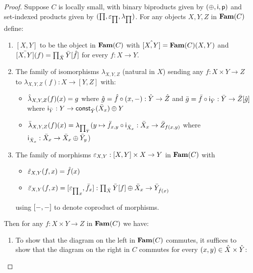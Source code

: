 \begin{proof}
Suppose $C$ is locally small, with binary biproducts given by $(\oplus,\mathsf{i},\mathsf{p})$ and set-indexed products
given by $(\prod,\varepsilon_{\prod},\lambda_{\prod})$. For any objects $X, Y, Z$ in $\mathbf{Fam}(C)$ define:

\begin{enumerate}
\item $[X, Y]$ to be the object in $\mathbf{Fam}(C)$ with $\hat{[X,Y]} = \mathbf{Fam}(C)(X,Y)$ and $\bar{[X, Y]}(f) =
\prod_{\hat{X}}\bar{Y}[\hat{f}]$ for every $f: X \to Y$.
\item The family of isomorphisms $\lambda_{X,Y,Z}$ (natural in $X$) sending any $f: X \times Y \to Z$ to
$\lambda_{X,Y,Z}(f): X \to [Y, Z]$ with:
\begin{itemize}
\item $\hat{\lambda}_{X,Y,Z}(f)(x) = g$ where $\hat{g} = \hat{f} \circ (x, -): \hat{Y} \to \hat{Z}$ and
$\bar{g} = \bar{f} \circ \mathsf{i}_{\bar{Y}}: \bar{Y} \to \bar{Z}[\hat{g}]$ where $\mathsf{i}_{\bar{Y}}:
Y \to \mathsf{const}_{\hat{Y}}(\bar{X}_x) \oplus Y$
\item $\bar{\lambda}_{X,Y,Z}(f)(x) = \lambda_{\prod_{\hat{Y}}}(y \mapsto \bar{f}_{x, y} \circ
\mathsf{i}_{\bar{X}_x}: \bar{X}_x \to \bar{Z}_{f(x,y)}$ where $\mathsf{i}_{\bar{X}_x}: \bar{X}_x \to \bar{X}_x
\oplus \bar{Y}_y$)
\end{itemize}
\item The family of morphisms $\varepsilon_{X,Y}: [X, Y] \times X \to Y$ in $\mathbf{Fam}(C)$ with
\begin{itemize}
\item $\hat{\varepsilon}_{X,Y}(f, x) = \hat{f}(x)$
\item $\bar{\varepsilon}_{X,Y}(f, x) = [{\varepsilon_{\prod}}_x, \bar{f}_x]:
\prod_{\hat{X}}\bar{Y}[f] \oplus \bar{X}_x \to \bar{Y}_{\hat{f}(x)}$
\end{itemize}
using $[-, -]$ to denote coproduct of morphisms.
\end{enumerate}
Then for any $f: X \times Y \to Z$ in $\mathbf{Fam}(C)$ we have:
\begin{enumerate}
\item To show that the diagram on the left in $\mathbf{Fam}(C)$ commutes, it suffices to show that the diagram on the
right in $C$ commutes for every $(x, y) \in \hat{X} \times \hat{Y}$:


\end{enumerate}
\end{proof}
